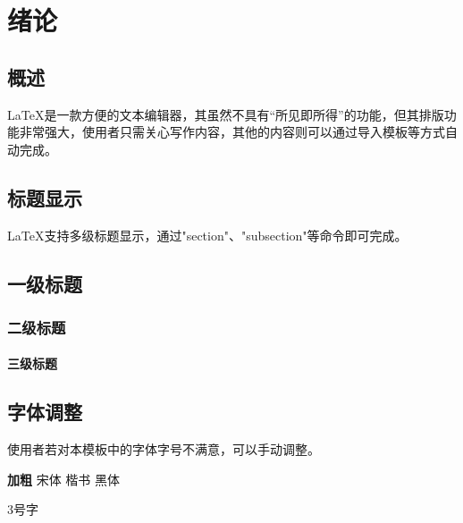 \chapter{绪论}
\section{概述}

\LaTeX 是一款方便的文本编辑器，其虽然不具有“所见即所得”的功能，但其排版功能非常强大，使用者只需关心写作内容，其他的内容则可以通过导入模板等方式自动完成。

\section{标题显示}

\LaTeX 支持多级标题显示，通过"section"、"subsection"等命令即可完成。

\section{一级标题}

\subsection{二级标题}

\subsubsection{三级标题}

\section{字体调整}

使用者若对本模板中的字体字号不满意，可以手动调整。

{\textbf{加粗}} {\songti 宋体} {\kaishu 楷书} {\heiti 黑体}

{ 3号字}

